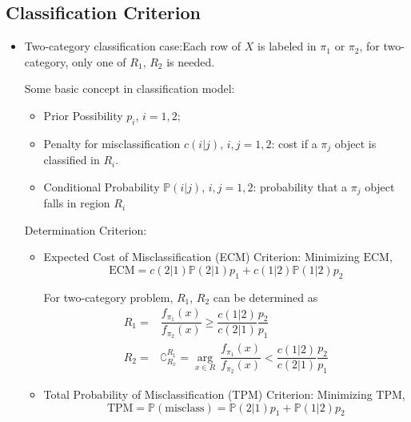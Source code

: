 \subsection{Classification Criterion}
\begin{itemize}[topsep=2pt,itemsep=2pt]
    \item Two-category classification case:Each row of $ X $ is labeled in $ \pi_1 $ or $ \pi_2 $, for two-category, only one of $ R_1 $, $ R_2 $ is needed.

    Some basic concept in classification model:
    \begin{itemize}[topsep=2pt,itemsep=2pt]
        \item Prior Possibility $ p_i $, $ i=1,2 $;
        \item Penalty for misclassification $ c(i|j) $, $ i,j=1,2 $: cost if a $ \pi_j $ object is classified in $ R_i $.
        \item Conditional Probability $ \mathbb{P}(i|j) $, $ i,j=1,2 $: probability that a $ \pi_j $ object falls in region $ R_i $
    \end{itemize}

    \begin{point}
Determination Criterion:
    \end{point}
\begin{itemize}[topsep=2pt,itemsep=2pt]
    \item Expected Cost of Misclassification (ECM) Criterion: Minimizing $ \mathrm{ECM} $,
    \begin{equation}
        \mathrm{ECM}=c(2|1)\mathbb{P}(2|1)p_1+c(1|2)\mathbb{P}(1|2)p_2 
    \end{equation}
    
    For two-category problem, $ R_1 $, $ R_2 $ can be determined as
    \begin{align}
        R_1=&\dfrac{f_{\pi_1}(x)}{f_{\pi_2}(x)}\geq \dfrac{c(1|2)}{c(2|1)}\dfrac{p_2}{p_1}\\
        R_2=&\complement_{R_x}^{R_1}=\mathop{\arg}\limits_{x\in R} \,  \dfrac{f_{\pi_1}(x)}{f_{\pi_2}(x)}<\dfrac{c(1|2)}{c(2|1)}\dfrac{p_2}{p_1}
    \end{align}
    \item Total Probability of Misclassification (TPM) Criterion: Minimizing $\mathrm{TPM}$,
    \begin{equation}
        \mathrm{TPM}=\mathbb{P}(\mathrm{misclass})=\mathbb{P}(2|1)p_1+\mathbb{P}(1|2)p_2 
    \end{equation}


\end{itemize}
\end{itemize}
